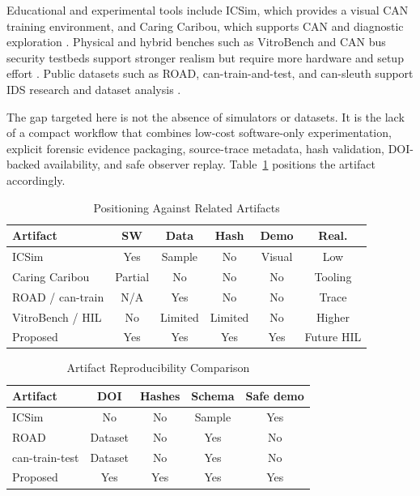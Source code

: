 \documentclass[conference]{IEEEtran}
\begin{document}
Educational and experimental tools include ICSim, which provides a visual CAN training environment, and Caring Caribou, which supports CAN and diagnostic exploration \cite{icsim,caringcaribou,smith2016carhackers}. Physical and hybrid benches such as VitroBench and CAN bus security testbeds support stronger realism but require more hardware and setup effort \cite{yeo2023vitrobench,shi2022canbus}. Public datasets such as ROAD, can-train-and-test, and can-sleuth support IDS research and dataset analysis \cite{verma2024road,lampe2024cantrain,cansleuth2024}.

The gap targeted here is not the absence of simulators or datasets. It is the lack of a compact workflow that combines low-cost software-only experimentation, explicit forensic evidence packaging, source-trace metadata, hash validation, DOI-backed availability, and safe observer replay. Table~\ref{tab:positioning} positions the artifact accordingly.

\begin{table}[t]
\caption{Positioning Against Related Artifacts}
\label{tab:positioning}
\centering
\footnotesize
\begin{tabular}{p{}ccccc}
\toprule
Artifact & SW & Data & Hash & Demo & Real. \\
\midrule
ICSim & Yes & Sample & No & Visual & Low \\
Caring Caribou & Partial & No & No & No & Tooling \\
ROAD / can-train & N/A & Yes & No & No & Trace \\
VitroBench / HIL & No & Limited & Limited & No & Higher \\
Proposed & Yes & Yes & Yes & Yes & Future HIL \\
\bottomrule
\end{tabular}
\end{table}

\begin{table}[t]
\caption{Artifact Reproducibility Comparison}
\label{tab:artifactcompare}
\centering
\footnotesize
\begin{tabular}{lcccc}
\toprule
Artifact & DOI & Hashes & Schema & Safe demo \\
\midrule
ICSim & No & No & Sample & Yes \\
ROAD & Dataset & No & Yes & No \\
can-train-test & Dataset & No & Yes & No \\
Proposed & Yes & Yes & Yes & Yes \\
\bottomrule
\end{tabular}
\end{table}
\end{document}
